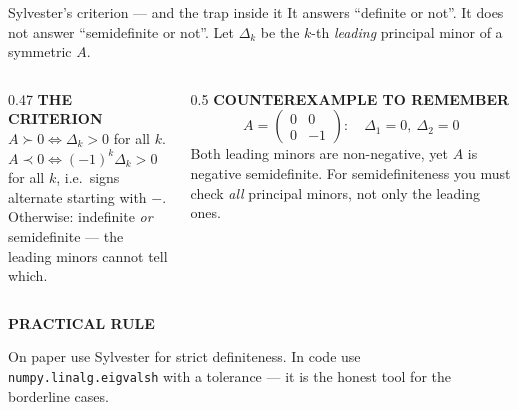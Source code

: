 \documentclass[aspectratio=169,11pt]{beamer}
\newcommand{\kicker}[1]{{\color{hseaccent}\scriptsize\bfseries\MakeUppercase{#1}}}
\newcommand{\takeaway}[2]{%
  \par\smallskip\noindent
  \colorbox{hselight}{\parbox{\dimexpr\textwidth-2\fboxsep}{%
    \kicker{#1}\par\vspace{0.12em}\footnotesize #2}}\par}
\begin{document}
\begin{frame}{Sylvester's criterion --- and the trap inside it}
  {It answers ``definite or not''. It does not answer ``semidefinite or not''.}
  \vspace{0.1em}
  Let $\Delta_k$ be the $k$-th \emph{leading} principal minor of a symmetric $A$.
  \vspace{0.3em}
  \begin{columns}[T,onlytextwidth]
    \begin{column}{0.47\textwidth}
      \kicker{the criterion}\\[0.3em]
      {\footnotesize
        $A\succ 0 \iff \Delta_k>0$ for all $k$.\\[0.35em]
        $A\prec 0 \iff (-1)^k\Delta_k>0$ for all $k$, i.e.\ signs alternate starting with $-$.\\[0.35em]
        Otherwise: indefinite \emph{or} semidefinite --- the leading minors cannot tell which.}
    \end{column}
    \begin{column}{0.5\textwidth}
      \kicker{counterexample to remember}\\[0.3em]
      \[ A=\begin{pmatrix}0&0\\0&-1\end{pmatrix}:\quad \Delta_1=0,\ \Delta_2=0 \]
      {\small Both leading minors are non-negative, yet $A$ is negative semidefinite. For semidefiniteness
        you must check \emph{all} principal minors, not only the leading ones.}
    \end{column}
  \end{columns}
  \vspace{0.4em}
  \takeaway{practical rule}{On paper use Sylvester for strict definiteness. In code use
    \texttt{numpy.linalg.eigvalsh} with a tolerance --- it is the honest tool for the borderline cases.}
\end{frame}
\end{document}
